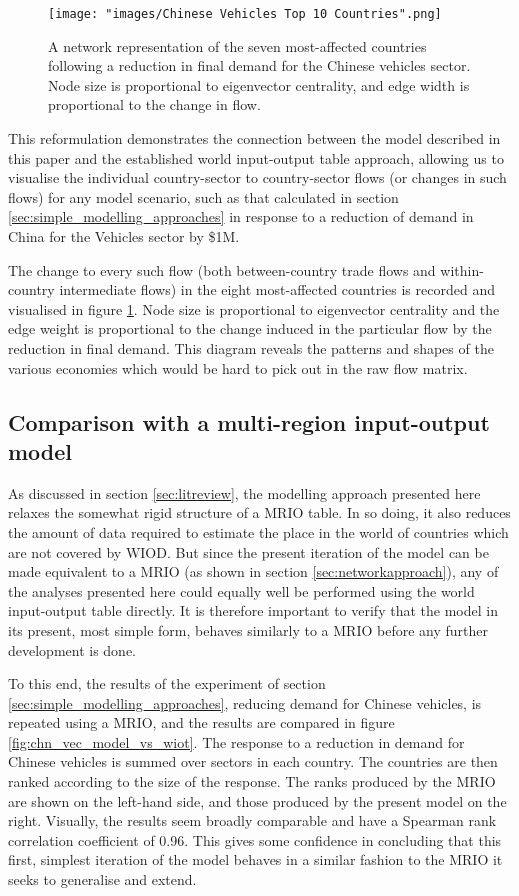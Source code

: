 \documentclass[a4paper]{article}
\begin{document}
\begin{figure}[tb]
\centering
\texttt{[image: "images/Chinese Vehicles Top 10 Countries".png]}
\caption{A network representation of the seven most-affected countries following a reduction in final demand for the Chinese vehicles sector. Node size is proportional to eigenvector centrality, and edge width is proportional to the change in flow.}\label{fig:chnvehtop6}
\end{figure}

This reformulation demonstrates the connection between the model described in this paper and the established world input-output table approach, allowing us to visualise the individual country-sector to country-sector flows (or changes in such flows) for any model scenario, such as that calculated in section \ref{sec:simple_modelling_approaches} in response to a reduction of demand in China for the Vehicles sector by \$1M.

The change to every such flow (both between-country trade flows and within-country intermediate flows) in the eight most-affected countries is recorded and visualised in figure \ref{fig:chnvehtop6}.
Node size is proportional to eigenvector centrality and the edge weight is proportional to the change induced in the particular flow by the reduction in final demand.
This diagram reveals the patterns and shapes of the various economies which would be hard to pick out in the raw flow matrix.

\subsection{Comparison with a multi-region input-output model}
As discussed in section \ref{sec:litreview}, the modelling approach presented here relaxes the somewhat rigid structure of a MRIO table.
In so doing, it also reduces the amount of data required to estimate the place in the world of countries which are not covered by WIOD.
But since the present iteration of the model can be made equivalent to a MRIO (as shown in section \ref{sec:networkapproach}), any of the analyses presented here could equally well be performed using the world input-output table directly.
It is therefore important to verify that the model in its present, most simple form, behaves similarly to a MRIO before any further development is done.

To this end, the results of the experiment of section \ref{sec:simple_modelling_approaches}, reducing demand for Chinese vehicles, is repeated using a MRIO, and the results are compared in figure \ref{fig:chn_vec_model_vs_wiot}.
The response to a reduction in demand for Chinese vehicles is summed over sectors in each country.
The countries are then ranked according to the size of the response.
The ranks produced by the MRIO are shown on the left-hand side, and those produced by the present model on the right.
Visually, the results seem broadly comparable and have a Spearman rank correlation coefficient \parencite{spearman_proof_1904} of 0.96.
This gives some confidence in concluding that this first, simplest iteration of the model behaves in a similar fashion to the MRIO it seeks to generalise and extend.
\end{document}

